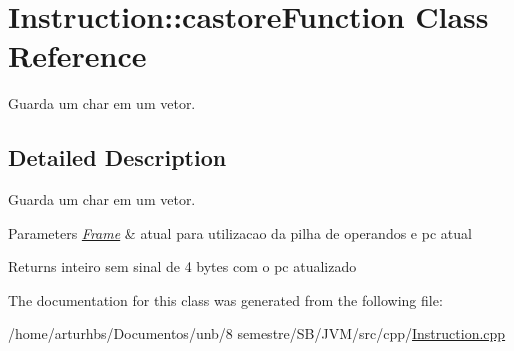 \hypertarget{classInstruction_1_1castoreFunction}{}\section{Instruction\+:\+:castore\+Function Class Reference}
\label{classInstruction_1_1castoreFunction}


Guarda um char em um vetor.  




\subsection{Detailed Description}
Guarda um char em um vetor. 


\begin{DoxyParams}{Parameters}
{\em \hyperlink{classFrame}{Frame}} & atual para utilizacao da pilha de operandos e pc atual \\
\hline
\end{DoxyParams}
\begin{DoxyReturn}{Returns}
inteiro sem sinal de 4 bytes com o pc atualizado 
\end{DoxyReturn}


The documentation for this class was generated from the following file\+:\begin{DoxyCompactItemize}
\item 
/home/arturhbs/\+Documentos/unb/8 semestre/\+S\+B/\+J\+V\+M/src/cpp/\hyperlink{Instruction_8cpp}{Instruction.\+cpp}\end{DoxyCompactItemize}
